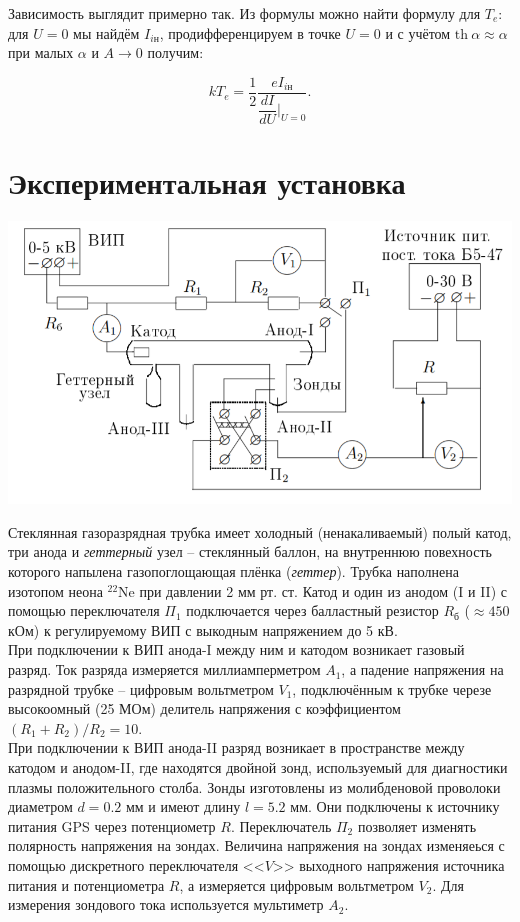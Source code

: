 \documentclass[a4paper,12pt]{article}
\begin{document}
Зависимость выглядит примерно так.
Из формулы можно найти формулу для $T_e$: для $U=0$ мы найдём $I_{i\text{н}}$, продифференцируем в точке $U=0$ и с учётом $\text{th}~\alpha \approx \alpha$ при малых $\alpha$ и $A\rightarrow 0$ получим:

\begin{equation}
    kT_e = \dfrac{1}{2}\dfrac{eI_{i\text{н}}}{\dfrac{dI}{dU}|_{U=0}}.
\end{equation}

\section{Экспериментальная установка}

\begin{center}
    \includegraphics[scale=0.9]{ust-1.png}
\end{center}

Стеклянная газоразрядная трубка имеет холодный (ненакаливаемый) полый катод, три анода и \textit{геттерный} узел -- стеклянный баллон, на внутреннюю повехность которого напылена газопоглощающая плёнка (\textit{геттер}). Трубка наполнена изотопом неона $^22$Ne при давлении 2 мм рт. ст. Катод и один из анодом (I и II) с помощью переключателя $\Pi_1$ подключается через балластный резистор $R_\text{б}$ ($\approx 450$ кОм) к регулируемому ВИП с выкодным напряжением до 5 кВ.\\

При подключении к ВИП анода-I между ним и катодом возникает газовый разряд. Ток разряда измеряется миллиамперметром $A_1$, а падение напряжения на разрядной трубке -- цифровым вольтметром $V_1$, подключённым к трубке черезе высокоомный (25 МОм) делитель напряжения с коэффициентом $(R_1+R_2)/R_2 = 10$.\\

При подключении к ВИП анода-II разряд возникает в пространстве между катодом и анодом-II, где находятся двойной зонд, используемый для диагностики плазмы положительного столба. Зонды изготовлены из молибденовой проволоки диаметром $d = 0.2$ мм и имеют длину $l = 5.2$ мм. Они подключены к источнику питания GPS через потенциометр $R$. Переключатель $\Pi_2$ позволяет изменять полярность напряжения на зондах. Величина напряжения на зондах изменяеься с помощью дискретного переключателя <<$V$>> выходного напряжения источника питания и потенциометра $R$, а измеряется цифровым вольтметром $V_2$. Для измерения зондового тока используется мультиметр $A_2$.
\end{document}

